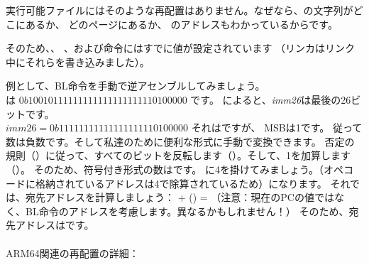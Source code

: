 実行可能ファイルにはそのような再配置はありません。なぜなら、の文字列がどこにあるか、
どのページにあるか、 \puts のアドレスもわかっているからです。

そのため、、 \ADD 、および命令にはすでに値が設定されています
（リンカはリンク中にそれらを書き込みました）。




例として、BL命令を手動で逆アセンブルしてみましょう。\\
は $0b10010111111111111111111110100000$ です。 
 によると、\emph{imm26}は最後の26ビットです。\\
$imm26 = 0b11111111111111111110100000$
それはですが、 \ac{MSB}は1です。
従って数は負数です。そして私達のために便利な形式に手動で変換できます。
否定の規則（）に従って、すべてのビットを反転します（）。そして、1を加算します（）。
そのため、符号付き形式の数はです。 
に4を掛けてみましょう。（オペコードに格納されているアドレスは4で除算されているため）になります。 
それでは、宛先アドレスを計算しましょう： + () = 
（注意：現在の\ac{PC}の値ではなく、BL命令のアドレスを考慮します。異なるかもしれません！）
 そのため、宛先アドレスはです。\\
\\
ARM64関連の再配置の詳細： \ARMELF

